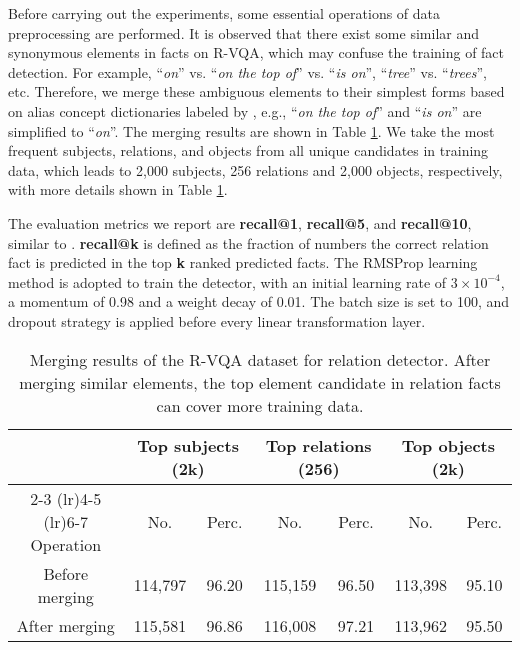 \documentclass[sigconf]{acmart}
\begin{document}
Before carrying out the experiments, some essential operations of data preprocessing are performed. It is observed that there exist some similar and synonymous elements in facts on R-VQA, which may confuse the training of fact detection. For example, ``\textit{on}'' vs. ``\textit{on the top of}'' vs. ``\textit{is on}'', ``\textit{tree}'' vs. ``\textit{trees}'', etc. Therefore, we merge these ambiguous elements to their simplest forms based on alias concept dictionaries labeled by \cite{krishna2017visual},  e.g., ``\textit{on the top of}'' and ``\textit{is on}'' are simplified to ``\textit{on}''. The merging results are shown in Table \ref{tab:detector-data}. We take the most frequent subjects, relations, and objects from all unique candidates in training data, which leads to 2,000 subjects, 256 relations and 2,000 objects, respectively, with more details shown in Table \ref{tab:detector-data}.

The evaluation metrics we report are \textbf{recall@1}, \textbf{recall@5}, and \textbf{recall@10}, similar to \cite{lu2016visual}. \textbf{recall@k} is defined as the fraction of numbers the correct relation fact is predicted in the top \textbf{k} ranked predicted facts. The RMSProp learning method is adopted to train the detector, with an initial learning rate of $3\times10^{-4}$, a momentum of 0.98 and a weight decay of 0.01. The batch size is set to 100,
and dropout strategy is applied before every linear transformation layer. 

\begin{table}[t]
	\centering 
\footnotesize
\begin{tabular}{*7{c}} 
		\toprule	
		\multirow{2}{*}{}	& \multicolumn{2}{c}{Top subjects (2k)} 	& \multicolumn{2}{c}{Top relations (256)} 	& \multicolumn{2}{c}{Top objects (2k)}  \\
		\cmidrule(lr){2-3} 	\cmidrule(lr){4-5} 	  \cmidrule(lr){6-7} 	
		Operation    	&  No.   &   Perc. 		&  No.   &   Perc. 		&  No.   &   Perc.   \\
		\midrule
		Before merging    &  114,797   &   96.20   & 115,159   &   96.50		&   113,398   &   95.10  \\
		After merging  	& 115,581   &   96.86 	& 116,008   &   97.21 	& 113,962  &   95.50 \\
		\bottomrule		
	\end{tabular}
	\caption{Merging results of the R-VQA dataset for relation detector. After merging similar elements, the top element candidate in relation facts can cover more training data.}
	\label{tab:detector-data}
\end{table}
\end{document}
